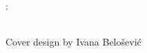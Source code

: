 
\thispagestyle{empty}

\hfill

\vfill

\noindent\myName: \textit{\myTitle} \\%
\textcopyright~\myTime

\bigskip

\noindent Cover design by Ivana Belošević







